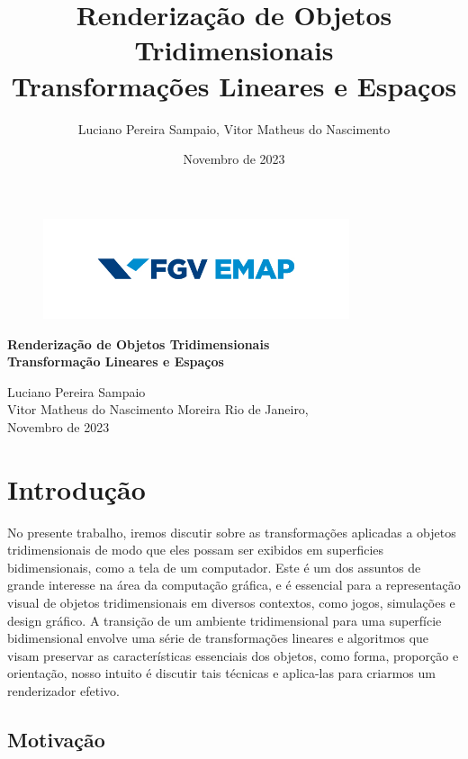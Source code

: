 \documentclass[12pt]{article}
\title{Renderização de Objetos Tridimensionais \\
\large Transformações Lineares e Espaços}
\author{Luciano Pereira Sampaio, Vitor Matheus do Nascimento}
\date{Novembro de 2023}
\begin{document}
\thispagestyle{empty}

\begin{figure}
    \centering
    \includegraphics[width=9cm]{imgs/emap.jpg}
    \vspace{4cm}	
\end{figure}

\begin{center}
    {\huge \bf Renderização de Objetos Tridimensionais \\
    \vspace{0.5cm}
    \large Transformação Lineares e Espaços}

    \vspace{2cm}

    {Luciano Pereira Sampaio \\
    Vitor Matheus do Nascimento Moreira}
    \vfill
    Rio de Janeiro, \\
    Novembro de 2023
\end{center}
\pagebreak

\setcounter{page}{1}
\tableofcontents
\pagebreak


\section{Introdução}

No presente trabalho, iremos discutir sobre as transformações aplicadas a objetos tridimensionais de modo que eles possam ser exibidos em superficies bidimensionais, como a tela de um computador. Este é um dos assuntos de grande interesse na área da computação gráfica, e é essencial para a representação visual de objetos tridimensionais em diversos contextos, como jogos, simulações e design gráfico. A transição de um ambiente tridimensional para uma superfície bidimensional envolve uma série de transformações lineares e algoritmos que visam preservar as características essenciais dos objetos, como forma, proporção e orientação, nosso intuito é discutir tais técnicas e aplica-las para criarmos um renderizador efetivo.

\subsection{Motivação}
\end{document}
